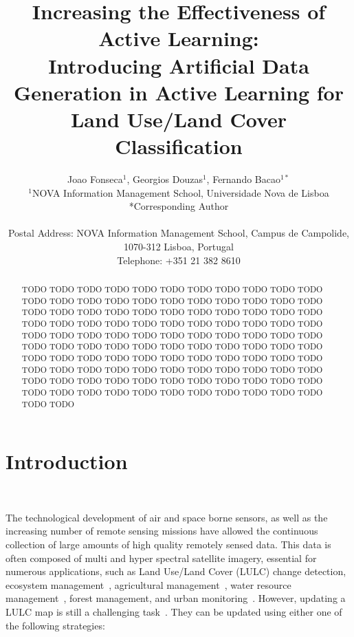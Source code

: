 \documentclass[parskip=full]{scrartcl}
\title{Increasing the Effectiveness of Active Learning:\\ 
	\LARGE{Introducing Artificial Data Generation in Active Learning for Land Use/Land Cover Classification}}
\author{
	Joao Fonseca\(^{1}\), Georgios Douzas\(^{1}\), Fernando Bacao\(^{1*}\) 
	\\
	\small{\(^{1}\)NOVA Information Management School, Universidade Nova de Lisboa}
	\\
	\small{*Corresponding Author}
	\\
	\\
	\small{Postal Address: NOVA Information Management School, Campus de Campolide, 1070-312 Lisboa, Portugal}
	\\
	\small{Telephone: +351 21 382 8610}
}
\date{}
\begin{document}
\maketitle

\begin{abstract}
	TODO TODO TODO TODO TODO TODO TODO TODO TODO TODO TODO TODO TODO TODO TODO TODO
	TODO TODO TODO TODO TODO TODO TODO TODO TODO TODO TODO TODO TODO TODO TODO TODO
	TODO TODO TODO TODO TODO TODO TODO TODO TODO TODO TODO TODO TODO TODO TODO TODO
	TODO TODO TODO TODO TODO TODO TODO TODO TODO TODO TODO TODO TODO TODO TODO TODO
	TODO TODO TODO TODO TODO TODO TODO TODO TODO TODO TODO TODO TODO TODO TODO TODO
	TODO TODO TODO TODO TODO TODO TODO TODO TODO TODO TODO TODO TODO TODO TODO TODO
	TODO TODO TODO TODO TODO TODO TODO TODO TODO TODO TODO TODO TODO TODO TODO TODO
\end{abstract}

\section{Introduction}~\label{sec:introduction}

The technological development of air and space borne sensors, as well as the increasing number of
remote sensing missions have allowed the continuous collection of large amounts of high quality
remotely sensed data. This data is often composed of multi and hyper spectral satellite imagery,
essential for numerous applications, such as Land Use/Land Cover (LULC) change detection, ecosystem
management~\cite{Nagai2020}, agricultural management~\cite{Huang2018}, water resource
management~\cite{Wang2018}, forest management, and urban monitoring~\cite{Khatami2016}. However,
updating a LULC map is still a challenging task~\cite{Gavade2019, Wulder2018}. They can be updated
using either one of the following strategies:
\end{document}
